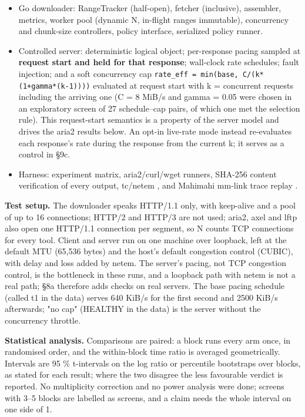\documentclass{ieeeaccess}
\begin{document}
\begin{itemize}
\item Go downloader: RangeTracker (half-open), fetcher (inclusive), assembler, metrics, worker pool (dynamic N, in-flight ranges immutable), concurrency and chunk-size controllers, policy interface, serialized policy runner.
\item Controlled server: deterministic logical object; per-response pacing sampled at \textbf{request start and held for that response}; wall-clock rate schedules; fault injection; and a soft concurrency cap \texttt{rate\_eff = min(base, C/\allowbreak{}(k*(1+gamma*(k-1))))} evaluated at request start with k = concurrent requests including the arriving one (C = 8 MiB/s and gamma = 0.05 were chosen in an exploratory screen of 27 schedule–cap pairs, of which one met the selection rule). This request-start semantics is a property of the server model and drives the aria2 results below. An opt-in live-rate mode instead re-evaluates each response's rate during the response from the current k; it serves as a control in §9c.
\item Harness: experiment matrix, aria2/curl/wget runners, SHA-256 content verification of every output, tc/netem \cite{tcnetem}, and Mahimahi mm-link trace replay \cite{netravali2015mahimahi}.
\end{itemize}

\textbf{Test setup.} The downloader speaks HTTP/1.1 only, with keep-alive and a pool of up to 16 connections; HTTP/2 and HTTP/3 are not used; aria2, axel and lftp also open one HTTP/1.1 connection per segment, so N counts TCP connections for every tool. Client and server run on one machine over loopback, left at the default MTU (65,536 bytes) and the host's default congestion control (CUBIC), with delay and loss added by netem. The server's pacing, not TCP congestion control, is the bottleneck in these runs, and a loopback path with netem is not a real path; §8a therefore adds checks on real servers. The base pacing schedule (called t1 in the data) serves 640 KiB/s for the first second and 2500 KiB/s afterwards; "no cap" (HEALTHY in the data) is the server without the concurrency throttle.


\textbf{Statistical analysis.} Comparisons are paired: a block runs every arm once, in randomised order, and the within-block time ratio is averaged geometrically. Intervals are 95 \% t-intervals on the log ratio or percentile bootstraps over blocks, as stated for each result; where the two disagree the less favourable verdict is reported. No multiplicity correction and no power analysis were done; screens with 3–5 blocks are labelled as screens, and a claim needs the whole interval on one side of 1.
\end{document}
